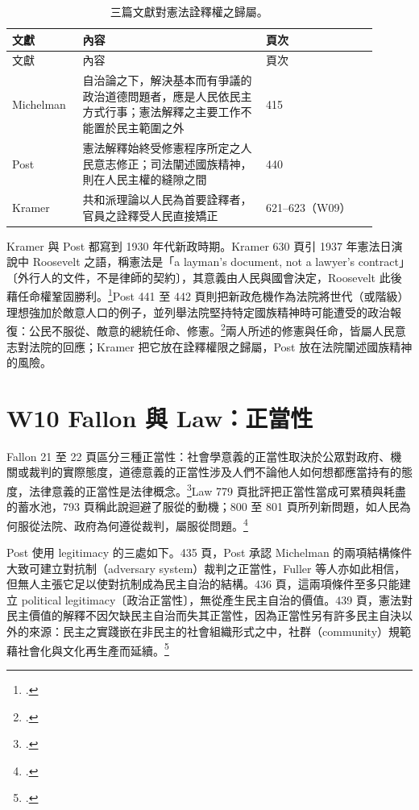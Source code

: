 \begin{longtable}{@{}L{0.16\linewidth}L{0.46\linewidth}L{0.28\linewidth}@{}}
\caption{三篇文獻對憲法詮釋權之歸屬。}\\
\toprule
文獻 & 內容 & 頁次 \\
\midrule
\endfirsthead
\toprule
文獻 & 內容 & 頁次 \\
\midrule
\endhead
Michelman & 自治論之下，解決基本而有爭議的政治道德問題者，應是人民依民主方式行事；憲法解釋之主要工作不能置於民主範圍之外 & 415 \\
Post & 憲法解釋始終受修憲程序所定之人民意志修正；司法闡述國族精神，則在人民主權的縫隙之間 & 440 \\
Kramer & 共和派理論以人民為首要詮釋者，官員之詮釋受人民直接矯正 & 621--623（W09） \\
\bottomrule
\end{longtable}

Kramer 與 Post 都寫到 1930 年代新政時期。Kramer 630 頁引 1937 年憲法日演說中 Roosevelt 之語，稱憲法是「a layman's document, not a lawyer's contract」〔外行人的文件，不是律師的契約〕，其意義由人民與國會決定，Roosevelt 此後藉任命權鞏固勝利。\footcite[630 \& n.33]{kramer2012}Post 441 至 442 頁則把新政危機作為法院將世代（或階級）理想強加於敵意人口的例子，並列舉法院堅持特定國族精神時可能遭受的政治報復：公民不服從、敵意的總統任命、修憲。\footcite[441--442]{post1998}兩人所述的修憲與任命，皆屬人民意志對法院的回應；Kramer 把它放在詮釋權限之歸屬，Post 放在法院闡述國族精神的風險。

\section{W10 Fallon 與 Law：正當性}
\label{sec:80_comparison-3}

Fallon 21 至 22 頁區分三種正當性：社會學意義的正當性取決於公眾對政府、機關或裁判的實際態度，道德意義的正當性涉及人們不論他人如何想都應當持有的態度，法律意義的正當性是法律概念。\footcite[21--22]{fallon2018}Law 779 頁批評把正當性當成可累積與耗盡的蓄水池，793 頁稱此說迴避了服從的動機；800 至 801 頁所列新問題，如人民為何服從法院、政府為何遵從裁判，屬服從問題。\footcite[779, 793, 800--801]{law2009}

Post 使用 legitimacy 的三處如下。435 頁，Post 承認 Michelman 的兩項結構條件大致可建立對抗制（adversary system）裁判之正當性，Fuller 等人亦如此相信，但無人主張它足以使對抗制成為民主自治的結構。436 頁，這兩項條件至多只能建立 political legitimacy〔政治正當性〕，無從產生民主自治的價值。439 頁，憲法對民主價值的解釋不因欠缺民主自治而失其正當性，因為正當性另有許多民主自決以外的來源：民主之實踐嵌在非民主的社會組織形式之中，社群（community）規範藉社會化與文化再生產而延續。\footcite[435--436, 439]{post1998}

